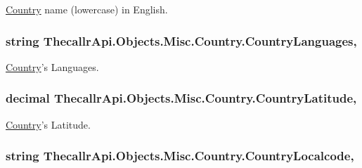 \hyperlink{class_thecallr_api_1_1_objects_1_1_misc_1_1_country}{Country} name (lowercase) in English. 

\hypertarget{class_thecallr_api_1_1_objects_1_1_misc_1_1_country_afa4bcb2e1475731e0f8a52cbdd4bc587}{
\subsubsection[{Country\+Languages}]{\setlength{\rightskip}{0pt plus 5cm}string Thecallr\+Api.\+Objects.\+Misc.\+Country.\+Country\+Languages\hspace{0.3cm}{\ttfamily [get]}, {\ttfamily [set]}}}\label{class_thecallr_api_1_1_objects_1_1_misc_1_1_country_afa4bcb2e1475731e0f8a52cbdd4bc587}


\hyperlink{class_thecallr_api_1_1_objects_1_1_misc_1_1_country}{Country}'s Languages. 

\hypertarget{class_thecallr_api_1_1_objects_1_1_misc_1_1_country_a685dc4405582869d93d7af0b59078e1e}{
\subsubsection[{Country\+Latitude}]{\setlength{\rightskip}{0pt plus 5cm}decimal Thecallr\+Api.\+Objects.\+Misc.\+Country.\+Country\+Latitude\hspace{0.3cm}{\ttfamily [get]}, {\ttfamily [set]}}}\label{class_thecallr_api_1_1_objects_1_1_misc_1_1_country_a685dc4405582869d93d7af0b59078e1e}


\hyperlink{class_thecallr_api_1_1_objects_1_1_misc_1_1_country}{Country}'s Latitude. 

\hypertarget{class_thecallr_api_1_1_objects_1_1_misc_1_1_country_a37f44dc37a8d928d89903f5f6e09ecad}{
\subsubsection[{Country\+Localcode}]{\setlength{\rightskip}{0pt plus 5cm}string Thecallr\+Api.\+Objects.\+Misc.\+Country.\+Country\+Localcode\hspace{0.3cm}{\ttfamily [get]}, {\ttfamily [set]}}}\label{class_thecallr_api_1_1_objects_1_1_misc_1_1_country_a37f44dc37a8d928d89903f5f6e09ecad}


